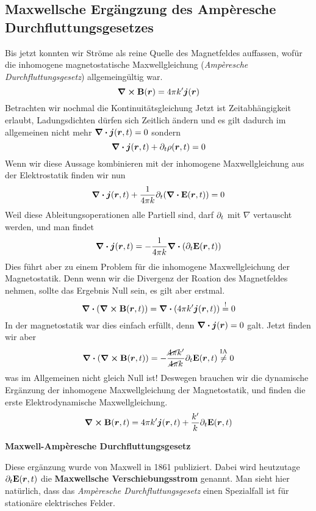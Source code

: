 \subsection{Maxwellsche Ergängzung des Ampèresche Durchfluttungsgesetzes}%
\label{sub:dyn-kontinuitaetsgleichung}
Bis jetzt konnten wir Ströme als reine Quelle des Magnetfeldes auffassen,
wofür die inhomogene magnetostatische Maxwellgleichung (\textit{Ampèresche Durchfluttungsgesetz}) allgemeingültig war.
\begin{equation*}
  \curl \vb B(\vb*r) = 4\pi k'\vb*j(\vb*r) 
\end{equation*}
Betrachten wir nochmal die Kontinuitätsgleichung
Jetzt ist Zeitabhängigkeit erlaubt, Ladungsdichten dürfen sich Zeitlich ändern
und es gilt dadurch im allgemeinen nicht mehr $\div\vb*j(\vb*r, t)=0$ sondern
\begin{equation}
  \div \vb*j(\vb*r, t) + \partial_t \rho(\vb*r, t) = 0
\end{equation}
Wenn wir diese Aussage kombinieren mit der inhomogene Maxwellgleichung aus der Elektrostatik finden wir nun
\begin{equation}
    \div \vb*j(\vb*r, t) + \frac{1}{4\pi k} \partial_t (\div\vb E(\vb*r, t)) = 0
\end{equation}
Weil diese Ableitungsoperationen alle Partiell sind, darf $\partial_t$ mit $\nabla$
vertauscht werden, und man findet
\begin{equation}
    \div \vb*j(\vb*r, t) = -\frac{1}{4\pi k} \div(\partial_t \vb E(\vb*r, t)) 
\end{equation}
Dies führt aber zu einem Problem für die inhomogene Maxwellgleichung der Magnetostatik. Denn wenn wir die Divergenz der Roation des Magnetfeldes nehmen,
sollte das Ergebnis Null sein, es gilt aber erstmal.
\begin{equation}
  \div(\curl \vb B(\vb*r, t)) = \div (4\pi k' \vb*j(\vb*r, t)) \stackrel!=0
\end{equation}
In der magnetostatik war dies einfach erfüllt, denn $\div\vb*j(\vb*r)=0$ galt. Jetzt finden wir aber
\begin{equation}
  \div(\curl \vb B(\vb*r, t)) = -\frac{\cancel{4\pi} k'}{\cancel{4\pi} k} \partial_t\vb E(\vb*r, t) \stackrel{\text{IA}}{\neq} 0
\end{equation}
was im Allgemeinen nicht gleich Null ist! Deswegen brauchen wir die
dynamische Ergänzung der inhomogene Maxwellgleichung der Magnetostatik,
und finden die erste Elektrodynamische Maxwellgleichung.
\begin{equation}
  \curl \vb B(\vb*r, t) = 4\pi k' \vb*j(\vb*r, t) +  \frac{k'}{k}\partial_t\vb E(\vb*r, t) 
\end{equation}
\begin{center}
  \textbf{Maxwell-Ampèresche Durchfluttungsgesetz}
\end{center}
Diese ergänzung wurde von Maxwell in 1861 publiziert. Dabei wird heutzutage $\partial_t\vb E(\vb*r, t)$ die \textbf{Maxwellsche Verschiebungsstrom} genannt.
Man sieht hier natürlich, dass das \textit{Ampèresche Durchfluttungsgesetz} einen Spezialfall ist für stationäre elektrisches Felder.

